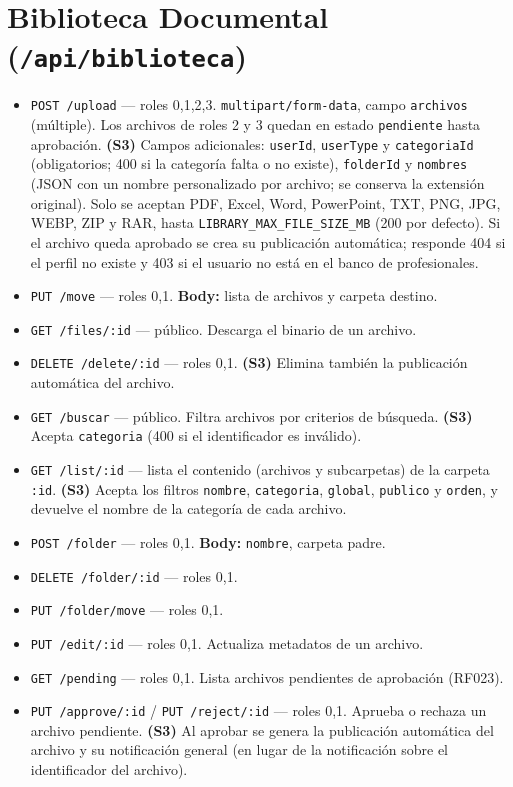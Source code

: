 \section{Biblioteca Documental (\texttt{/api/biblioteca})}
\begin{itemize}
    \item \texttt{POST /upload} — roles 0,1,2,3. \texttt{multipart/form-data}, campo \texttt{archivos} (múltiple). Los archivos de roles 2 y 3 quedan en estado \texttt{pendiente} hasta aprobación. \textbf{(S3)} Campos adicionales: \texttt{userId}, \texttt{userType} y \texttt{categoriaId} (obligatorios; 400 si la categoría falta o no existe), \texttt{folderId} y \texttt{nombres} (JSON con un nombre personalizado por archivo; se conserva la extensión original). Solo se aceptan PDF, Excel, Word, PowerPoint, TXT, PNG, JPG, WEBP, ZIP y RAR, hasta \texttt{LIBRARY\_MAX\_FILE\_SIZE\_MB} (200 por defecto). Si el archivo queda aprobado se crea su publicación automática; responde 404 si el perfil no existe y 403 si el usuario no está en el banco de profesionales.
    \item \texttt{PUT /move} — roles 0,1. \textbf{Body:} lista de archivos y carpeta destino.
    \item \texttt{GET /files/:id} — público. Descarga el binario de un archivo.
    \item \texttt{DELETE /delete/:id} — roles 0,1. \textbf{(S3)} Elimina también la publicación automática del archivo.
    \item \texttt{GET /buscar} — público. Filtra archivos por criterios de búsqueda. \textbf{(S3)} Acepta \texttt{categoria} (400 si el identificador es inválido).
    \item \texttt{GET /list/:id} — lista el contenido (archivos y subcarpetas) de la carpeta \texttt{:id}. \textbf{(S3)} Acepta los filtros \texttt{nombre}, \texttt{categoria}, \texttt{global}, \texttt{publico} y \texttt{orden}, y devuelve el nombre de la categoría de cada archivo.
    \item \texttt{POST /folder} — roles 0,1. \textbf{Body:} \texttt{nombre}, carpeta padre.
    \item \texttt{DELETE /folder/:id} — roles 0,1.
    \item \texttt{PUT /folder/move} — roles 0,1.
    \item \texttt{PUT /edit/:id} — roles 0,1. Actualiza metadatos de un archivo.
    \item \texttt{GET /pending} — roles 0,1. Lista archivos pendientes de aprobación (RF023).
    \item \texttt{PUT /approve/:id} / \texttt{PUT /reject/:id} — roles 0,1. Aprueba o rechaza un archivo pendiente. \textbf{(S3)} Al aprobar se genera la publicación automática del archivo y su notificación general (en lugar de la notificación sobre el identificador del archivo).
\end{itemize}

